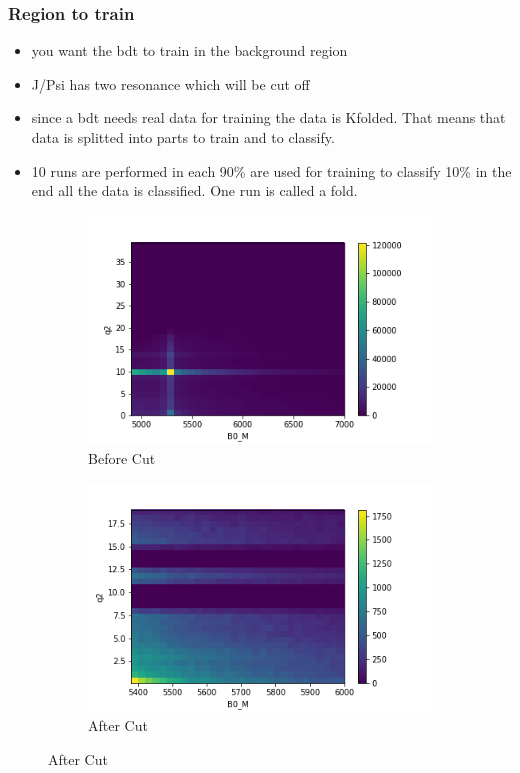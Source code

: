 \documentclass{beamer}
\begin{document}
\begin{frame}
  \frametitle{Region to train}
  \begin{itemize}
    \item you want the bdt to train in the background region
    \item J/Psi has two resonance which will be cut off
    \item since a bdt needs real data for training the data is Kfolded. That means that data is splitted into parts to train and to classify.
    \item 10 runs are performed in each 90\% are used for training to classify 10\% in the end all the data is classified. One run is called a fold.
  \end{itemize}

  \begin{figure}
\centering
\begin{subfigure}{0.5\textwidth}
  \centering
  \includegraphics[width=1\linewidth]{beforeCutPlot}
  \caption{Before Cut}
\end{subfigure}%
\begin{subfigure}{0.5\textwidth}
  \centering
  \includegraphics[width=1\linewidth]{cutPlot}
  \caption{After Cut}
\end{subfigure}
\end{figure}

\end{frame}
\end{document}
